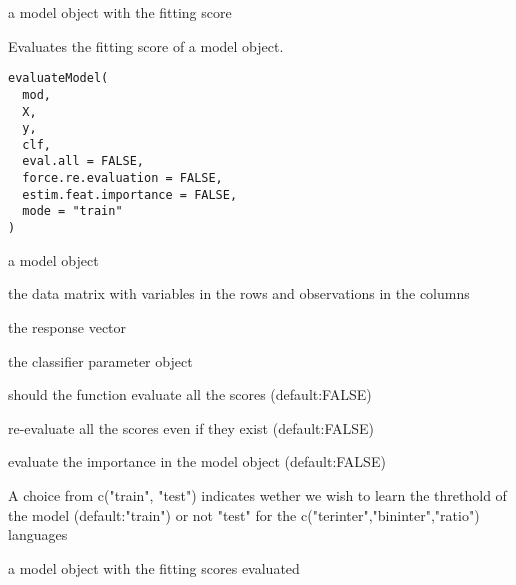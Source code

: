 \documentclass[a4paper]{book}
\begin{document}
%
\begin{Value}
a model object with the fitting score
\end{Value}
%
\begin{Description}
Evaluates the fitting score of a model object.
\end{Description}
%
\begin{Usage}
\begin{verbatim}
evaluateModel(
  mod,
  X,
  y,
  clf,
  eval.all = FALSE,
  force.re.evaluation = FALSE,
  estim.feat.importance = FALSE,
  mode = "train"
)
\end{verbatim}
\end{Usage}
%
\begin{Arguments}
\begin{ldescription}
\item[\code{mod:}] a model object

\item[\code{X:}] the data matrix with variables in the rows and observations in the columns

\item[\code{y:}] the response vector

\item[\code{clf:}] the classifier parameter object

\item[\code{eval.all:}] should the function evaluate all the scores (default:FALSE)

\item[\code{force.re.evaluation:}] re-evaluate all the scores even if they exist (default:FALSE)

\item[\code{estim.feat.importance:}] evaluate the importance in the model object (default:FALSE)

\item[\code{mode:}] A choice from c("train", "test") indicates wether we wish to learn the threthold 
of the model (default:"train") or not "test" for the c("terinter","bininter","ratio") languages
\end{ldescription}
\end{Arguments}
%
\begin{Value}
a model object with the fitting scores evaluated
\end{Value}
\end{document}
